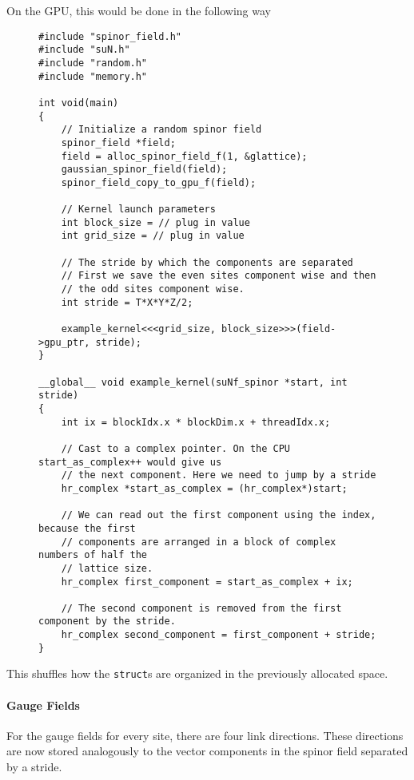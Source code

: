 \documentclass[12pt]{article}
\begin{document}
On the GPU, this would be done in the following way
\begin{figure}[H]
\begin{lstlisting}[caption=Low level access of single components on GPU]
#include "spinor_field.h"
#include "suN.h"
#include "random.h"
#include "memory.h"

int void(main)
{
    // Initialize a random spinor field
    spinor_field *field;
    field = alloc_spinor_field_f(1, &glattice);
    gaussian_spinor_field(field);
    spinor_field_copy_to_gpu_f(field);

    // Kernel launch parameters
    int block_size = // plug in value
    int grid_size = // plug in value

    // The stride by which the components are separated
    // First we save the even sites component wise and then
    // the odd sites component wise.
    int stride = T*X*Y*Z/2;

    example_kernel<<<grid_size, block_size>>>(field->gpu_ptr, stride);
}

__global__ void example_kernel(suNf_spinor *start, int stride)
{
    int ix = blockIdx.x * blockDim.x + threadIdx.x;

    // Cast to a complex pointer. On the CPU start_as_complex++ would give us
    // the next component. Here we need to jump by a stride
    hr_complex *start_as_complex = (hr_complex*)start;

    // We can read out the first component using the index, because the first
    // components are arranged in a block of complex numbers of half the
    // lattice size.
    hr_complex first_component = start_as_complex + ix;

    // The second component is removed from the first component by the stride.
    hr_complex second_component = first_component + stride;
}
\end{lstlisting}
\end{figure}
This shuffles how the \texttt{struct}s are organized in the previously allocated space.


\paragraph{Gauge Fields}
For the gauge fields for every site, there are four link directions. These directions are now stored analogously to the vector components in the spinor field separated by a stride.
\end{document}
